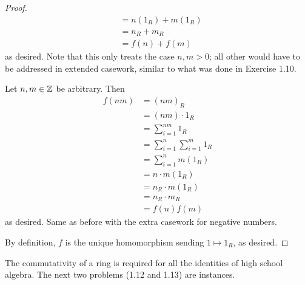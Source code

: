 \documentclass[../psets.tex]{subfiles}
\begin{document}
\begin{enumerate}[resume]
\begin{proof}
\begin{align*}
            &= n(1_R)+m(1_R)\\
            &= n_R+m_R\\
            &= f(n)+f(m)
        \end{align*}
        as desired. Note that this only treats the case $n,m>0$; all other would have to be addressed in extended casework, similar to what was done in Exercise 1.10.\par
        Let $n,m\in\mathbb{Z}$ be arbitrary. Then
        \begin{align*}
            f(nm) &= (nm)_R\\
            &= (nm)\cdot 1_R\\
            &= \sum_{i=1}^{nm}1_R\\
            &= \sum_{i=1}^n\sum_{i=1}^m1_R\\
            &= \sum_{i=1}^nm(1_R)\\
            &= n\cdot m(1_R)\\
            &= n_R\cdot m(1_R)\tag*{Problem 1.10}\\
            &= n_R\cdot m_R\\
            &= f(n)f(m)
        \end{align*}
        as desired. Same as before with the extra casework for negative numbers.\par
        By definition, $f$ is the unique homomorphism sending $1\mapsto 1_R$, as desired.
    \end{proof}
\end{enumerate}
The commutativity of a ring is required for all the identities of high school algebra. The next two problems (1.12 and 1.13) are instances.
\end{document}
